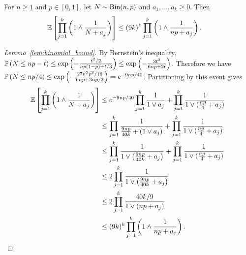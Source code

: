 \begin{lemma}%
  \label{lem:binomial_bound}
  For $n \geq 1$ and $p \in [0,1]$,
  let $N \sim \Bin(n, p)$ and $a_1, \ldots, a_k \geq 0$.
  Then
  \begin{align*}
    \E\left[
      \prod_{j=1}^k
      \left(
        1 \wedge
        \frac{1}{N + a_j}
      \right)
    \right]
    &\leq
    (9k)^k
    \prod_{j=1}^k
    \left(
      1 \wedge
      \frac{1}{n p + a_j}
    \right).
  \end{align*}
\end{lemma}

\begin{proof}[Lemma~\ref{lem:binomial_bound}]
  By Bernstein's inequality,
  $\P\left( N \leq n p - t \right)
  \leq \exp\left(-\frac{t^2/2}{n p(1-p) + t/3}\right)
  \leq \exp\left(-\frac{3t^2}{6n p + 2t}\right)$.
  Therefore we have
  $\P\left( N \leq n p/4 \right)
  \leq \exp\left(-\frac{27 n^2 p^2 / 16}{6n p + 3 n p / 2}\right)
  = e^{-9 n p / 40}$.
  Partitioning by this event gives
  \begin{align*}
    \E\left[
      \prod_{j=1}^k
      \left(
        1 \wedge
        \frac{1}{N + a_j}
      \right)
    \right]
    &\leq
    e^{-9 n p / 40}
    \prod_{j=1}^k
    \frac{1}{1 \vee a_j}
    + \prod_{j=1}^k
    \frac{1}{1 \vee (\frac{n p}{4} + a_j)} \\
    &\leq
    \prod_{j=1}^k
    \frac{1}{\frac{9 n p}{40k} + (1 \vee a_j)}
    + \prod_{j=1}^k
    \frac{1}{1 \vee (\frac{n p}{4} + a_j)} \\
    &\leq
    \prod_{j=1}^k
    \frac{1}{1 \vee \left(\frac{9 n p}{40k} + a_j\right)}
    + \prod_{j=1}^k
    \frac{1}{1 \vee (\frac{n p}{4} + a_j)} \\
    &\leq
    2 \prod_{j=1}^k
    \frac{1}{1 \vee \left(\frac{9 n p}{40k} + a_j\right)} \\
    &\leq
    2 \prod_{j=1}^k
    \frac{40k/9}{1 \vee \left(n p + a_j\right)} \\
    &\leq
    (9k)^k
    \prod_{j=1}^k
    \left(
      1 \wedge
      \frac{1}{n p + a_j}
    \right).
  \end{align*}
\end{proof}

